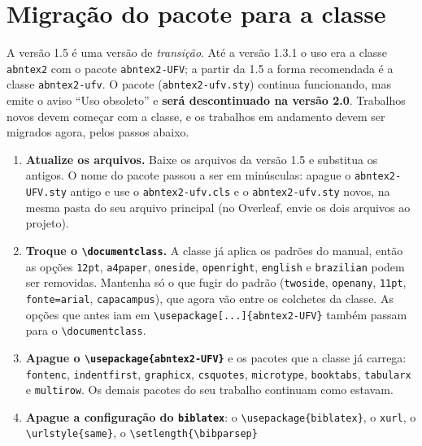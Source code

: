 \section{Migração do pacote para a classe}\label{sec:migracao}

A versão 1.5 é uma versão de \emph{transição}. Até a versão 1.3.1 o uso era a classe
\texttt{abntex2} com o pacote \texttt{abntex2-UFV}; a partir da 1.5 a forma recomendada é a
classe \texttt{abntex2-ufv}. O pacote (\texttt{abntex2-ufv.sty}) continua funcionando, mas
emite o aviso ``Uso obsoleto'' e \textbf{será descontinuado na versão 2.0}. Trabalhos novos
devem começar com a classe, e os trabalhos em andamento devem ser migrados agora, pelos
passos abaixo.

\begin{enumerate}
  \item \textbf{Atualize os arquivos.} Baixe os arquivos da versão 1.5 e substitua os antigos.
        O nome do pacote passou a ser em minúsculas: apague o \texttt{abntex2-UFV.sty} antigo
        e use o \texttt{abntex2-ufv.cls} e o \texttt{abntex2-ufv.sty} novos, na mesma pasta do
        seu arquivo principal (no Overleaf, envie os dois arquivos ao projeto).
  \item \textbf{Troque o \texttt{\textbackslash documentclass}.} A classe já aplica os padrões
        do manual, então as opções \texttt{12pt}, \texttt{a4paper}, \texttt{oneside},
        \texttt{openright}, \texttt{english} e \texttt{brazilian} podem ser removidas. Mantenha
        só o que fugir do padrão (\texttt{twoside}, \texttt{openany}, \texttt{11pt},
        \texttt{fonte=arial}, \texttt{capacampus}), que agora vão entre os colchetes da classe.
        As opções que antes iam em \texttt{\textbackslash usepackage[...]\{abntex2-UFV\}}
        também passam para o \texttt{\textbackslash documentclass}.
  \item \textbf{Apague o \texttt{\textbackslash usepackage\{abntex2-UFV\}}} e os pacotes que
        a classe já carrega: \texttt{fontenc}, \texttt{indentfirst}, \texttt{graphicx},
        \texttt{csquotes}, \texttt{microtype}, \texttt{booktabs}, \texttt{tabularx} e
        \texttt{multirow}. Os demais pacotes do seu trabalho continuam como estavam.
  \item \sloppy\textbf{Apague a configuração do \texttt{biblatex}}: o \texttt{\textbackslash usepackage\allowbreak[backend=biber,
        style=abnt, ...]\allowbreak\{biblatex\}}, o \texttt{xurl}, o
        \texttt{\textbackslash urlstyle\{same\}}, o \texttt{\textbackslash setlength\{\textbackslash bibparsep\}}

\end{enumerate}

